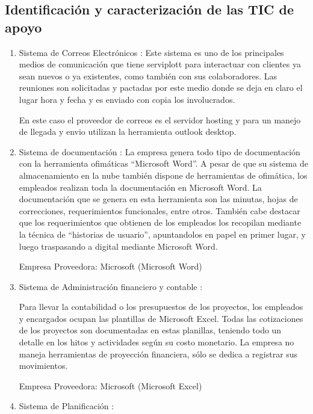 	
	\subsection{Identificación y caracterización de las TIC de apoyo}
	
	\begin{enumerate}[1)]
	\item Sistema de Correos Electrónicos : Este sistema es uno de los principales medios de comunicación que tiene serviplott para interactuar con clientes ya sean nuevos o ya existentes, como también con sus colaboradores.  Las reuniones son solicitadas y pactadas por este medio donde se deja en claro el lugar hora y fecha y es enviado con copia los involucrados.   
	

En este caso el proveedor de correos es el servidor hosting y para un manejo de llegada y envio utilizan la herramienta outlook desktop.  

	\item Sistema de documentación : La empresa genera todo tipo de documentación con la herramienta ofimáticas “Microsoft Word”. A pesar de que su sistema de almacenamiento en la nube también dispone de herramientas de ofimática, los empleados realizan toda la documentación en Microsoft Word.
La documentación que se genera en esta herramienta son las minutas, hojas de correcciones, requerimientos funcionales, entre otros. También cabe destacar que los requerimientos que obtienen de los empleados los recopilan mediante la técnica de “historias de usuario”, apuntandolos en papel en primer lugar, y luego traspasando a digital mediante Microsoft Word. 



Empresa Proveedora: Microsoft (Microsoft Word)


	\item Sistema de Administración  financiero y contable :

Para llevar la contabilidad o los presupuestos de los proyectos, los empleados y encargados ocupan las plantillas de Microsoft Excel. Todas las cotizaciones de los proyectos son documentadas en estas planillas, teniendo todo un detalle en los hitos y actividades según su costo monetario. La empresa no maneja herramientas de proyección financiera, sólo se dedica a registrar sus movimientos.

Empresa Proveedora: Microsoft (Microsoft Excel)

	\item Sistema de Planificación :


\end{enumerate}
